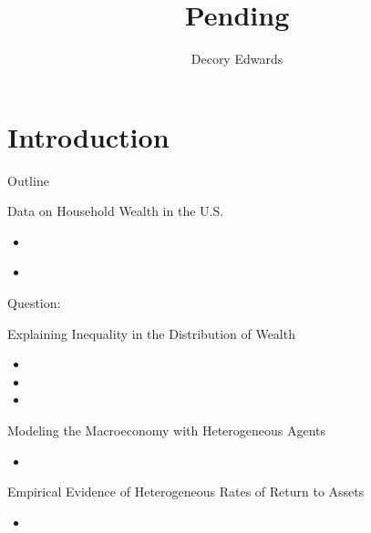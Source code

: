\documentclass[pdflatex]{beamer}
\title[]{Pending}
\author[Edwards]{Decory Edwards}
\institute[JHU]{Johns Hopkins University}
\date[\today]{}
\begin{document}


\begin{frame}[plain]
  \titlepage
\end{frame}

\section{Introduction}

\begin{frame}{Outline}
\end{frame}

\begin{frame}{Data on Household Wealth in the U.S.}
    
    \begin{itemize}
    \item \cite{wolff2004}
    \item \cite{sz16}  
    \end{itemize}
    
\vspace{2em}    
    Question:
\end{frame}

\begin{frame}
    \begin{figure}[H]
    \centering
    \caption{}
    \end{figure}
\end{frame}

\begin{frame}{Explaining Inequality in the Distribution of Wealth}

    \begin{itemize}
    \item 
    \item 
    \item   
    \end{itemize}
  \end{frame}

\begin{frame}{Modeling the Macroeconomy with Heterogeneous Agents}

    \begin{itemize}
    \item 
    \end{itemize}
    
\end{frame}

\begin{frame}{Empirical Evidence of Heterogeneous Rates of Return to Assets}

   \begin{itemize}
    \item 
    \end{itemize}
  
\end{frame}
\end{document}

